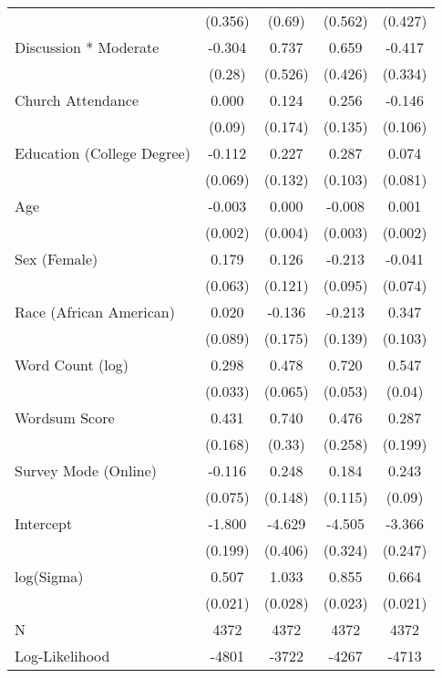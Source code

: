 \begin{table}[ht]
\begin{tabular}{lcccc}
   & (0.356) & (0.69) & (0.562) & (0.427) \\ 
  Discussion * Moderate & -0.304 &  0.737 &  0.659 & -0.417 \\ 
   & (0.28) & (0.526) & (0.426) & (0.334) \\ 
  Church Attendance &  0.000 &  0.124 &  0.256 & -0.146 \\ 
   & (0.09) & (0.174) & (0.135) & (0.106) \\ 
  Education (College Degree) & -0.112 &  0.227 &  0.287 &  0.074 \\ 
   & (0.069) & (0.132) & (0.103) & (0.081) \\ 
  Age & -0.003 &  0.000 & -0.008 &  0.001 \\ 
   & (0.002) & (0.004) & (0.003) & (0.002) \\ 
  Sex (Female) &  0.179 &  0.126 & -0.213 & -0.041 \\ 
   & (0.063) & (0.121) & (0.095) & (0.074) \\ 
  Race (African American) &  0.020 & -0.136 & -0.213 &  0.347 \\ 
   & (0.089) & (0.175) & (0.139) & (0.103) \\ 
  Word Count (log) &  0.298 &  0.478 &  0.720 &  0.547 \\ 
   & (0.033) & (0.065) & (0.053) & (0.04) \\ 
  Wordsum Score &  0.431 &  0.740 &  0.476 &  0.287 \\ 
   & (0.168) & (0.33) & (0.258) & (0.199) \\ 
  Survey Mode (Online) & -0.116 &  0.248 &  0.184 &  0.243 \\ 
   & (0.075) & (0.148) & (0.115) & (0.09) \\ 
  Intercept & -1.800 & -4.629 & -4.505 & -3.366 \\ 
   & (0.199) & (0.406) & (0.324) & (0.247) \\ 
  log(Sigma) &  0.507 &  1.033 &  0.855 &  0.664 \\ 
   & (0.021) & (0.028) & (0.023) & (0.021) \\ 
   \hline
N & 4372 & 4372 & 4372 & 4372 \\ 
  Log-Likelihood & -4801 & -3722 & -4267 & -4713 \\ 
   \hline
\end{tabular}
\endgroup
\end{table}
